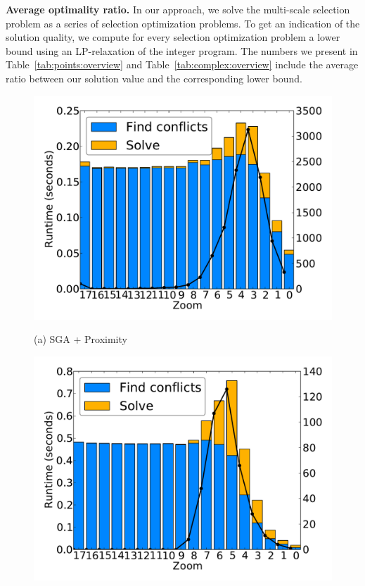 \documentclass[11pt, oneside]{report}
\newcommand{\minisec}[1]{\noindent\textbf{#1.}}
\begin{document}
\minisec{Average optimality ratio}
In our approach, we solve the multi-scale selection problem as a series of selection optimization problems. To get an indication of the solution quality, we compute for every selection optimization problem a lower bound using an LP-relaxation of the integer program. The numbers we present in Table~\ref{tab:points:overview} and Table~\ref{tab:complex:overview} include the average ratio between our solution value and the corresponding lower bound.


\begin{figure}[tb]
  \begin{minipage}{0.329\linewidth}
    \centerline{\includegraphics[width=0.9\linewidth]{./figs-cvl/prelim_pnt_7k_airports_heuristic_B.pdf}}
    \centerline{(a) SGA + Proximity}
  \end{minipage} \hfill
  \begin{minipage}{0.329\linewidth}
    \centerline{\includegraphics[width=0.9\linewidth]{./figs-cvl/prelim_pnt_7k_airports_lp_A.pdf}}

\end{minipage}
\end{figure}
\end{document}

